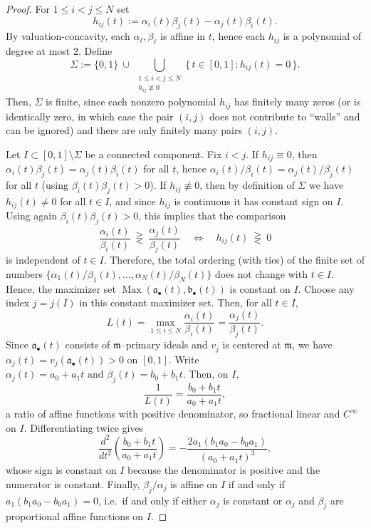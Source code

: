 \documentclass[12pt]{amsart}
\newcommand{\m}{\mathfrak m}
\renewcommand{\a}{\mathfrak{a}}
\renewcommand{\b}{\mathfrak{b}}
\DeclareMathOperator{\Max}{Max}
\newcommand{\abul}{{\a_\bullet}}
\newcommand{\bbul}{{\b_\bullet}}
\theoremstyle{plain}
\theoremstyle{definition}
\numberwithin{equation}{section}
\begin{document}
\begin{proof}
	For $1\le i<j\le N$ set
	\[
	h_{ij}(t):=\alpha_i(t)\beta_j(t)-\alpha_j(t)\beta_i(t).
	\]
	By valuation-concavity, each $\alpha_\ell,\beta_\ell$ is affine in $t$, hence each $h_{ij}$ is a polynomial
	of degree at most $2$. Define
	\[
	\Sigma:=\{0,1\}\ \cup\ \bigcup_{\substack{1\le i<j\le N\\ h_{ij}\not\equiv 0}}\{\,t\in[0,1]:h_{ij}(t)=0\,\}.
	\]
	Then, $\Sigma$ is finite, since each nonzero polynomial $h_{ij}$ has finitely many zeros (or is identically zero, in which case the pair $(i,j)$ does not contribute to ``walls'' and can be ignored) and there are only finitely many
	pairs $(i,j)$.
	
	Let $I\subset[0,1]\setminus\Sigma$ be a connected component. Fix $i<j$.
	If $h_{ij}\equiv 0$, then $\alpha_i(t)\beta_j(t)=\alpha_j(t)\beta_i(t)$ for all $t$, hence
	$\alpha_i(t)/\beta_i(t)=\alpha_j(t)/\beta_j(t)$ for all $t$ (using $\beta_i(t)\beta_j(t)>0$).
	If $h_{ij}\not\equiv 0$, then by definition of $\Sigma$ we have $h_{ij}(t)\neq 0$ for all $t\in I$, and since
	$h_{ij}$ is continuous it has constant sign on $I$. Using again $\beta_i(t)\beta_j(t)>0$, this implies that the comparison
	\[
	\frac{\alpha_i(t)}{\beta_i(t)}\ \gtreqless\ \frac{\alpha_j(t)}{\beta_j(t)}
	\quad\Longleftrightarrow\quad
	h_{ij}(t)\ \gtreqless\ 0
	\]
	is independent of $t\in I$. Therefore, the total ordering (with ties) of the finite set of numbers
	$\{\alpha_1(t)/\beta_1(t),\dots,\alpha_N(t)/\beta_N(t)\}$ does not change with $t\in I$. Hence, the maximizer set
	$\Max(\abul(t),\bbul(t))$ is constant on $I$. Choose any index $j=j(I)$ in this constant maximizer set. Then, for all $t\in I$,
	\[
	L(t)=\max_{1\le i\le N}\frac{\alpha_i(t)}{\beta_i(t)}=\frac{\alpha_j(t)}{\beta_j(t)}.
	\]
	Since $\abul(t)$ consists of $\m$--primary ideals and $v_j$ is centered at $\m$, we have $\alpha_j(t)=v_j(\abul(t))>0$ on $[0,1]$.
	Write $\alpha_j(t)=a_0+a_1 t \text{ and } \beta_j(t)=b_0+b_1 t.$
	Then, on $I$,
	\[
	\frac{1}{L(t)}=\frac{b_0+b_1 t}{a_0+a_1 t},
	\]
	a ratio of affine functions with positive denominator, so fractional linear and $C^\infty$ on $I$.
	Differentiating twice gives
	\[
	\frac{d^2}{dt^2}\left(\frac{b_0+b_1 t}{a_0+a_1 t}\right)
	=
	-\frac{2a_1(b_1 a_0-b_0 a_1)}{(a_0+a_1 t)^3},
	\]
	whose sign is constant on $I$ because the denominator is positive and the numerator is constant.
	Finally, $\beta_j/\alpha_j$ is affine on $I$ if and only if $a_1(b_1 a_0-b_0 a_1) = 0$, i.e.\ if and only if either $\alpha_j$ is constant or $\alpha_j$ and $\beta_j$ are proportional affine functions on $I$.
\end{proof}
\end{document}
